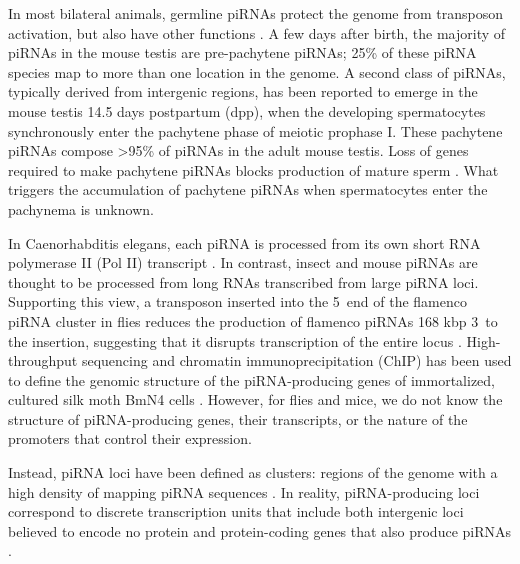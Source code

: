   In most bilateral animals, germline piRNAs protect the genome from transposon activation, but also have other functions \citep{Aravin2001, Aravin2007a, Aravin2008a, Vagin2004, Brennecke2007, Carmell2007, Hartig2007, Kuramochi2008, Ashe2012, Lee2012, Shirayama2012}. A few days after birth, the majority of piRNAs in the mouse testis are pre-pachytene piRNAs; 25\% of these piRNA species map to more than one location in the genome. A second class of piRNAs, typically derived from intergenic regions, has been reported to emerge in the mouse testis 14.5 days postpartum (dpp), when the developing spermatocytes synchronously enter the pachytene phase of meiotic prophase I. These pachytene piRNAs compose >95\% of piRNAs in the adult mouse testis. Loss of genes required to make pachytene piRNAs blocks production of mature sperm \citep{Deng2002c, Aravin2001, Reuter2011, Vourekas2012}. What triggers the accumulation of pachytene piRNAs when spermatocytes enter the pachynema is unknown.

  In Caenorhabditis elegans, each piRNA is processed from its own short RNA polymerase II (Pol II) transcript \citep{Gu2012}. In contrast, insect and mouse piRNAs are thought to be processed from long RNAs transcribed from large piRNA loci. Supporting this view, a transposon inserted into the 5\textprime~end of the flamenco piRNA cluster in flies reduces the production of flamenco piRNAs 168 kbp 3\textprime~to the insertion, suggesting that it disrupts transcription of the entire locus \citep{Brennecke2007}. High-throughput sequencing and chromatin immunoprecipitation (ChIP) has been used to define the genomic structure of the piRNA-producing genes of immortalized, cultured silk moth BmN4 cells \citep{Kawaoka2012}. However, for flies and mice, we do not know the structure of piRNA-producing genes, their transcripts, or the nature of the promoters that control their expression.

  Instead, piRNA loci have been defined as clusters: regions of the genome with a high density of mapping piRNA sequences \citep{Aravin2006,Girard2006, Grivna2006,Lau2006,Brennecke2007,Ro2007}. In reality, piRNA-producing loci correspond to discrete transcription units that include both intergenic loci believed to encode no protein \citep{Brennecke2007,Brennecke2008, Vourekas2012} and protein-coding genes that also produce piRNAs \citep{Aravin2007, Robine2009, Saito2009}.

